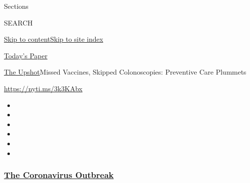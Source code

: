 Sections

SEARCH

\protect\hyperlink{site-content}{Skip to
content}\protect\hyperlink{site-index}{Skip to site index}

\href{https://myaccount.nytimes3xbfgragh.onion/auth/login?response_type=cookie\&client_id=vi}{}

\href{https://www.nytimes3xbfgragh.onion/section/todayspaper}{Today's
Paper}

\href{/section/upshot}{The Upshot}\textbar{}Missed Vaccines, Skipped
Colonoscopies: Preventive Care Plummets

\url{https://nyti.ms/3k3KAbx}

\begin{itemize}
\item
\item
\item
\item
\item
\item
\end{itemize}

\hypertarget{the-coronavirus-outbreak}{%
\subsubsection{\texorpdfstring{\href{https://www.nytimes3xbfgragh.onion/news-event/coronavirus?name=styln-coronavirus-national\&region=TOP_BANNER\&block=storyline_menu_recirc\&action=click\&pgtype=Article\&impression_id=fcb7adf0-f4b7-11ea-8a93-93f6319b6e62\&variant=undefined}{The
Coronavirus
Outbreak}}{The Coronavirus Outbreak}}\label{the-coronavirus-outbreak}}

